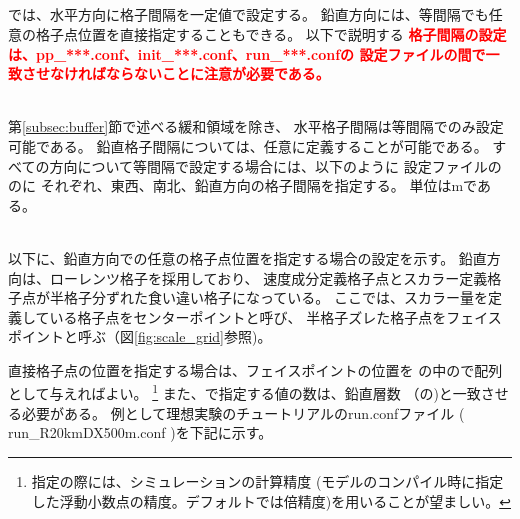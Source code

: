 \subsection{\SubsecGridIntvSettng} \label{subsec:gridinterv}
\scalerm では、水平方向に格子間隔を一定値で設定する。
鉛直方向には、等間隔でも任意の格子点位置を直接指定することもできる。
以下で説明する
\textcolor{red}{\bf 格子間隔の設定は、pp\_***.conf、init\_***.conf、run\_***.confの
設定ファイルの間で一致させなければならないことに注意が必要である。}

~\\

第\ref{subsec:buffer}節で述べる緩和領域を除き、
水平格子間隔は等間隔でのみ設定可能である。
鉛直格子間隔については、任意に定義することが可能である。
すべての方向について等間隔で設定する場合には、以下のように
設定ファイルののに
それぞれ、東西、南北、鉛直方向の格子間隔を指定する。
単位はmである。

\\


以下に、鉛直方向での任意の格子点位置を指定する場合の設定を示す。
鉛直方向は、ローレンツ格子を採用しており、
速度成分定義格子点とスカラー定義格子点が半格子分ずれた食い違い格子になっている。
ここでは、スカラー量を定義している格子点をセンターポイントと呼び、
半格子ズレた格子点をフェイスポイントと呼ぶ（図\ref{fig:scale_grid}参照)。

直接格子点の位置を指定する場合は、フェイスポイントの位置を
の中ので配列として与えればよい。
\footnote{指定の際には、シミュレーションの計算精度
(モデルのコンパイル時に指定した浮動小数点の精度。デフォルトでは倍精度)を用いることが望ましい。}
また、で指定する値の数は、鉛直層数
（の)と一致させる必要がある。
例として理想実験のチュートリアルのrun.confファイル
( run\_R20kmDX500m.conf )を下記に示す。

